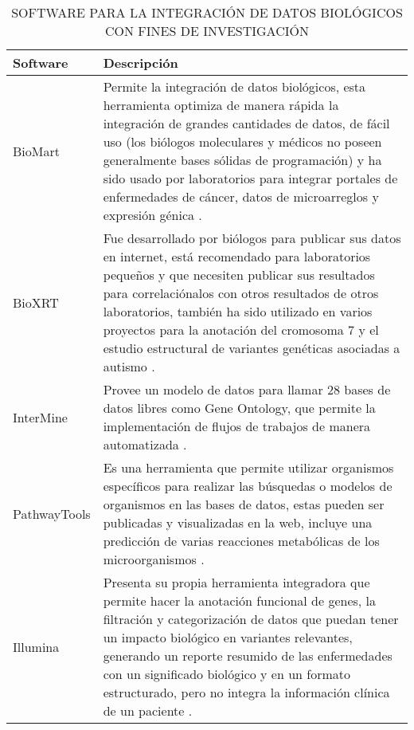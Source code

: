 \begin{table}[h]
	\centering
	\caption{SOFTWARE PARA LA INTEGRACIÓN DE DATOS BIOLÓGICOS CON FINES DE INVESTIGACIÓN}
	\label{inv}
	\begin{tabular}{|l|p{10cm}|}
		\hline
		Software     & Descripción                                                                                                                                                                                                                                                                                                                                                                                 \\ \hline
		BioMart      & Permite la integración de datos biológicos, esta herramienta optimiza  de manera rápida la integración de grandes cantidades de datos, de fácil uso (los biólogos moleculares y médicos no poseen generalmente bases sólidas de programación) y ha sido usado por laboratorios para integrar portales de enfermedades de cáncer, datos de microarreglos y expresión génica \cite{Triplet2014}.     \\ \cline{1-2}
		BioXRT       & Fue desarrollado por biólogos para publicar sus datos en internet, está recomendado para laboratorios pequeños  y que necesiten publicar sus resultados para correlaciónalos con otros resultados de otros laboratorios, también ha sido utilizado en varios  proyectos para la anotación del cromosoma 7 y el estudio estructural de variantes genéticas asociadas a autismo \cite{Triplet2014}.       \\ \cline{1-2}
		InterMine    & Provee un modelo de datos para llamar 28 bases de datos libres como Gene Ontology, que permite la implementación de flujos de trabajos de manera automatizada \cite{Triplet2014}.                                                                                                                                                                                                              \\ \hline
		PathwayTools & Es una herramienta que permite utilizar organismos específicos para realizar las búsquedas o modelos de organismos en las bases de datos, estas pueden ser publicadas y visualizadas en la web, incluye una predicción de varias reacciones metabólicas de los microorganismos \cite{Triplet2014}.                                                                                                  \\ \cline{1-2}
		Illumina     & Presenta su propia herramienta integradora que permite hacer la anotación funcional de genes,  la filtración y categorización de datos que puedan tener un impacto biológico en variantes relevantes, generando un reporte resumido de las enfermedades con un significado biológico y en un formato estructurado, pero no integra la información clínica de un paciente \cite{Illumina2017}.      \\ \hline
	\end{tabular}
\end{table}
